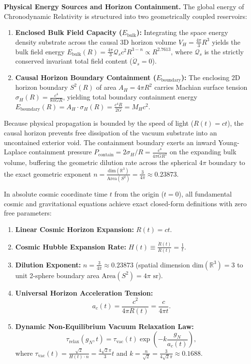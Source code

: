 \documentclass[aps,prd,reprint,superscriptaddress,nofootinbib,floatfix,amsmath,amssymb]{revtex4-2}
\begin{document}
\textbf{Physical Energy Sources and Horizon Containment.} The global energy of Chronodynamic Relativity is structured into two geometrically coupled reservoirs:
\begin{enumerate}
    \item \textbf{Enclosed Bulk Field Capacity ($E_{\text{bulk}}$):} Integrating the space energy density substrate across the causal 3D horizon volume $V_H = \frac{4\pi}{3}R^3$ yields the bulk field energy $E_{\text{bulk}}(R) = \frac{4\pi}{3}\mathcal{Q}_s c^2 R^{3-n} \propto R^{2.7613}$, where $\mathcal{Q}_s$ is the strictly conserved invariant total field content ($\dot{\mathcal{Q}}_s = 0$).
    \item \textbf{Causal Horizon Boundary Containment ($E_{\text{boundary}}$):} The enclosing 2D horizon boundary $S^2(R)$ of area $A_H = 4\pi R^2$ carries Machian surface tension $\sigma_H(R) = \frac{c^4}{8\pi G R}$, yielding total boundary containment energy $E_{\text{boundary}}(R) = A_H \cdot \sigma_H(R) = \frac{c^4 R}{2G} = M_H c^2$.
\end{enumerate}
Because physical propagation is bounded by the speed of light ($R(t)=ct$), the causal horizon prevents free dissipation of the vacuum substrate into an uncontained exterior void. The containment boundary exerts an inward Young-Laplace containment pressure $P_{\text{contain}} = 2\sigma_H / R = \frac{c^4}{4\pi G R^2}$ on the expanding bulk volume, buffering the geometric dilution rate across the spherical $4\pi$ boundary to the exact geometric exponent $n = \frac{\text{dim}(\mathbb{R}^3)}{\text{Area}(S^2)} = \frac{3}{4\pi} \approx 0.23873$.

In absolute cosmic coordinate time $t$ from the origin ($t=0$), all fundamental cosmic and gravitational equations achieve exact closed-form definitions with zero free parameters:
\begin{enumerate}
    \item \textbf{Linear Cosmic Horizon Expansion:} $R(t) = c t$.
    \item \textbf{Cosmic Hubble Expansion Rate:} $H(t) \equiv \frac{\dot{R}(t)}{R(t)} = \frac{1}{t}$.
    \item \textbf{Dilution Exponent:} $n = \frac{3}{4\pi} \approx 0.23873$ (spatial dimension $\text{dim}(\mathbb{R}^3) = 3$ to unit 2-sphere boundary area $\text{Area}(S^2) = 4\pi\text{ sr}$).
    \item \textbf{Universal Horizon Acceleration Tension:}
    \begin{equation}
    a_c(t) = \frac{c^2}{4\pi R(t)} = \frac{c}{4\pi t}.
    \label{eq:ac_t}
    \end{equation}
    \item \textbf{Dynamic Non-Equilibrium Vacuum Relaxation Law:}
    \begin{equation}
    \tau_{\text{relax}}(g_N, t) = \tau_{\text{vac}}(t) \exp\left(-k \frac{g_N}{a_c(t)}\right),
    \label{eq:tau_relax_law}
    \end{equation}
    where $\tau_{\text{vac}}(t) = \frac{\sqrt{2}}{H(t) \cdot n} = \frac{4\sqrt{2}\pi}{3} t$ and $k = \frac{n}{\sqrt{2}} = \frac{3}{4\sqrt{2}\pi} \approx 0.1688$.
\end{enumerate}
\end{document}
